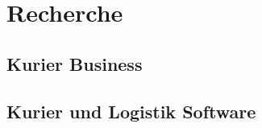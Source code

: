 \chapter{Recherche}
\label{sec:recherche}

\section{Kurier Business}
\section{Kurier und Logistik Software}